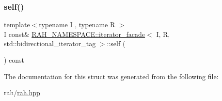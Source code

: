 \mbox{\label{struct_r_a_h___n_a_m_e_s_p_a_c_e_1_1iterator__facade_3_01_i_00_01_r_00_01std_1_1bidirectional__iterator__tag_01_4_a48a8492fca7c439acc3030cf9b0099bc}} 
\subsubsection{\texorpdfstring{self()}{self()}\hspace{0.1cm}{\footnotesize\ttfamily [2/2]}}
{\footnotesize\ttfamily template$<$typename I , typename R $>$ \\
I const\& \mbox{\hyperlink{struct_r_a_h___n_a_m_e_s_p_a_c_e_1_1iterator__facade}{R\+A\+H\+\_\+\+N\+A\+M\+E\+S\+P\+A\+C\+E\+::iterator\+\_\+facade}}$<$ I, R, std\+::bidirectional\+\_\+iterator\+\_\+tag $>$\+::self (\begin{DoxyParamCaption}{ }\end{DoxyParamCaption}) const\hspace{0.3cm}{\ttfamily [inline]}}



The documentation for this struct was generated from the following file\+:\begin{DoxyCompactItemize}
\item 
rah/\mbox{\hyperlink{rah_8hpp}{rah.\+hpp}}\end{DoxyCompactItemize}

